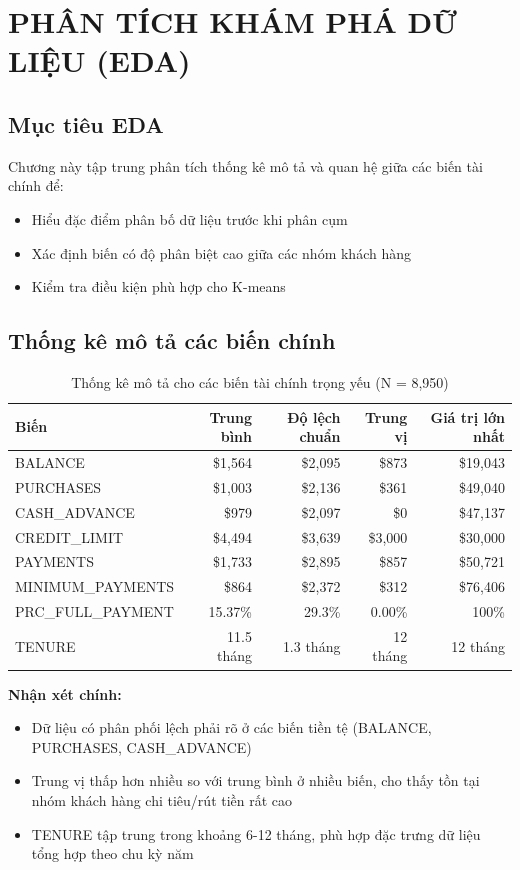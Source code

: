 ﻿\chapter{PHÂN TÍCH KHÁM PHÁ DỮ LIỆU (EDA)}

\section{Mục tiêu EDA}

Chương này tập trung phân tích thống kê mô tả và quan hệ giữa các biến tài chính để:
\begin{itemize}
    \item Hiểu đặc điểm phân bố dữ liệu trước khi phân cụm
    \item Xác định biến có độ phân biệt cao giữa các nhóm khách hàng
    \item Kiểm tra điều kiện phù hợp cho K-means
\end{itemize}

\section{Thống kê mô tả các biến chính}

\begin{table}[H]
\centering
\caption{Thống kê mô tả cho các biến tài chính trọng yếu (N = 8,950)}
\begin{tabular}{|l|r|r|r|r|}
\hline
\textbf{Biến} & \textbf{Trung bình} & \textbf{Độ lệch chuẩn} & \textbf{Trung vị} & \textbf{Giá trị lớn nhất} \\
\hline
BALANCE & \$1,564 & \$2,095 & \$873 & \$19,043 \\
\hline
PURCHASES & \$1,003 & \$2,136 & \$361 & \$49,040 \\
\hline
CASH\_ADVANCE & \$979 & \$2,097 & \$0 & \$47,137 \\
\hline
CREDIT\_LIMIT & \$4,494 & \$3,639 & \$3,000 & \$30,000 \\
\hline
PAYMENTS & \$1,733 & \$2,895 & \$857 & \$50,721 \\
\hline
MINIMUM\_PAYMENTS & \$864 & \$2,372 & \$312 & \$76,406 \\
\hline
PRC\_FULL\_PAYMENT & 15.37\% & 29.3\% & 0.00\% & 100\% \\
\hline
TENURE & 11.5 tháng & 1.3 tháng & 12 tháng & 12 tháng \\
\hline
\end{tabular}
\end{table}

\textbf{Nhận xét chính:}
\begin{itemize}
    \item Dữ liệu có phân phối lệch phải rõ ở các biến tiền tệ (BALANCE, PURCHASES, CASH\_ADVANCE)
    \item Trung vị thấp hơn nhiều so với trung bình ở nhiều biến, cho thấy tồn tại nhóm khách hàng chi tiêu/rút tiền rất cao
    \item TENURE tập trung trong khoảng 6-12 tháng, phù hợp đặc trưng dữ liệu tổng hợp theo chu kỳ năm
\end{itemize}

